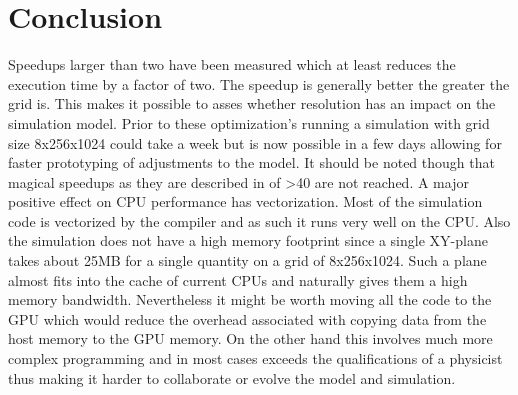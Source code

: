 \documentclass[master.tex]{subfiles}
\begin{document}
\section{Conclusion}
Speedups larger than two have been measured which at least reduces the execution time by a factor of two. The speedup is generally better the greater the grid is. This makes it possible to asses whether resolution has an impact on the simulation model. Prior to these optimization's running a simulation with grid size 8x256x1024 could take a week but is now possible in a few days allowing for faster prototyping of adjustments to the model. It should be noted though that magical speedups as they are described in \cite{CUDARedBlack} of >40 are not reached. A major positive effect on CPU performance has vectorization. Most of the simulation code is vectorized by the compiler and as such it runs very well on the CPU. Also the simulation does not have a high memory footprint since a single XY-plane takes about 25MB for a single quantity on a grid of 8x256x1024. Such a plane almost fits into the cache of current CPUs and naturally gives them a high memory bandwidth. Nevertheless it might be worth moving all the code to the GPU which would reduce the overhead associated with copying data from the host memory to the GPU memory. On the other hand this involves much more complex programming and in most cases exceeds the qualifications of a physicist thus making it harder to collaborate or evolve the model and simulation.
\end{document}
